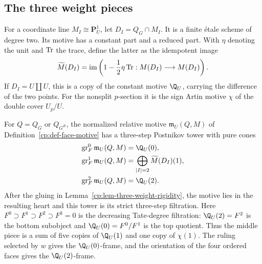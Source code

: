 \subsection{The three weight pieces}

For a coordinate line \(M_I\cong\mathbf P^1_U\), let
\(D_I=Q_G\cap M_I\).  It is a finite \'{e}tale scheme of degree two.  Its
motive has a constant part and a reduced part.  With \(\eta\) denoting the
unit and \(\operatorname{Tr}\) the trace, define the latter as the idempotent image
\begin{equation}
 \widetilde M(D_I)
 =\operatorname{im}\left(1-\frac12\eta\operatorname{Tr}:M(D_I)\longrightarrow M(D_I)
                  \right).
 \label{cp:eq-reduced-artin}
\end{equation}
If \(D_I=U\amalg U\), this is a copy of the constant motive \(\Q_U\),
carrying the difference of the two points.  For the nonsplit \(p\)-section
it is the sign Artin motive \(\chi\) of the double cover \(U_p/U\).

\begin{proposition}
\label{cp:prop-weight-calculation}
For \(Q=Q_G\) or \(Q_{G^R}\), the normalized relative motive
\(\mathfrak m_U(Q,M)\) of Definition~\ref{cp:def-face-motive} has a
three-step Postnikov tower with pure cones
\begin{equation}
 \begin{aligned}
  \gr_F^0\mathfrak m_U(Q,M)&=\Q_U(0),\\
  \gr_F^1\mathfrak m_U(Q,M)&=
       \bigoplus_{|I|=2}\widetilde M(D_I)(1),\\
  \gr_F^2\mathfrak m_U(Q,M)&=\Q_U(2).
 \end{aligned}
 \label{cp:eq-three-graded-pieces}
\end{equation}
After the gluing in Lemma~\ref{cp:lem-three-weight-rigidity}, the motive lies
in the resulting heart and this tower is its strict three-step filtration.
Here \(F^0\supset F^1\supset F^2\supset F^3=0\) is the decreasing
Tate-degree filtration: \(\Q_U(2)=F^2\) is the bottom subobject and
\(\Q_U(0)=F^0/F^1\) is the top quotient.
Thus the middle piece is a sum of five copies of \(\Q_U(1)\) and one copy
of \(\chi(1)\).  The ruling selected by \(w\) gives the
\(\Q_U(0)\)-frame, and the orientation of the four ordered faces gives the
\(\Q_U(2)\)-frame.
\end{proposition}

